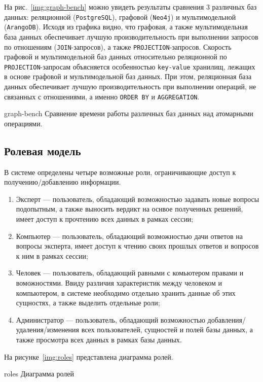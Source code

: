 На рис.~\ref{img:graph-bench} можно увидеть результаты сравнения 3 различных баз данных: реляционной (\texttt{PostgreSQL}), графовой (\texttt{Neo4j}) и мультимодельной (\texttt{ArangoDB}). 
Исходя из графика видно, что графовая, а также мультимодельная база данных обеспечивает лучшую производительность при выполнении запросов по отношениям (\texttt{JOIN}-запросов), а также \texttt{PROJECTION}-запросов. 
Скорость графовой и мультимодельной баз данных относительно реляционной по \texttt{PROJECTION}-запросам объясняется особенностью \texttt{key-value} хранилищ, лежащих в основе графовой и мультимодельной баз данных.
При этом, реляционная база данных обеспечивает лучшую производительность при выполнении операций, не связанных с отношениями, а именно \texttt{ORDER BY} и \texttt{AGGREGATION}.

\clearpage

\img{100mm}
{graph-bench}
{Сравнение времени работы различных баз данных над атомарными операциями.}

\subsection{Ролевая модель}
В системе определены четыре возможные роли, ограничивающие доступ к получению/добавлению информации.
\begin{enumerate}
  \item Эксперт --- пользователь, обладающий возможностью задавать новые вопросы подопытным, а также выносить вердикт на оснвое полученных решений, имеет доступ к прочтению всех данных в рамках сессии;
  \item Компьютер --- пользователь, обладающий возможностью дачи ответов на вопросы эксперта, имеет доступ к чтению своих прошлых ответов и вопросов к ним в рамках сессии;
  \item Человек --- пользователь, обладающий равными с комьютером правами и воможностями. Ввиду различия характеристик между человеком и компьютером, в системе необходимо отдельно хранить данные об этих сущностях, а также выделить отдельные роли;
  \item Администратор --- пользователь, обладающий возможностью добавления/удаления/изменения всех пользователей, сущностей и полей базы данных, а также просмотра всех данных в рамках базы данных.
\end{enumerate}

На рисунке~\ref{img:roles} представлена диаграмма ролей.

\img{160mm}
{roles}
{Диаграмма ролей}

